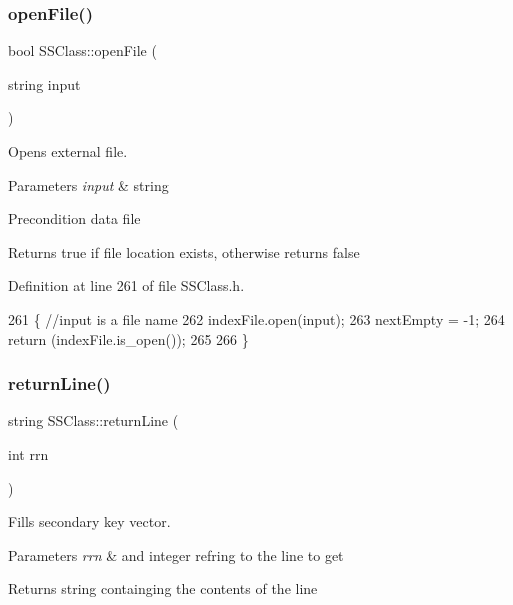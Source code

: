 \subsubsection{\texorpdfstring{open\+File()}{openFile()}}
{\footnotesize\ttfamily bool S\+S\+Class\+::open\+File (\begin{DoxyParamCaption}\item[{string}]{input }\end{DoxyParamCaption})}



Opens external file. 


\begin{DoxyParams}{Parameters}
{\em input} & string \\
\hline
\end{DoxyParams}
\begin{DoxyPrecond}{Precondition}
data file 
\end{DoxyPrecond}
\begin{DoxyReturn}{Returns}
true if file location exists, otherwise returns false 
\end{DoxyReturn}


Definition at line 261 of file S\+S\+Class.\+h.


\begin{DoxyCode}
261                                    \{ \textcolor{comment}{//input is a file name}
262     indexFile.open(input);
263     nextEmpty = -1;
264     \textcolor{keywordflow}{return} (indexFile.is\_open());
265 
266 \}
\end{DoxyCode}
\mbox{\label{classSSClass_ab0a8ea1af895df28359b5733bd920ef3}} 
\subsubsection{\texorpdfstring{return\+Line()}{returnLine()}}
{\footnotesize\ttfamily string S\+S\+Class\+::return\+Line (\begin{DoxyParamCaption}\item[{int}]{rrn }\end{DoxyParamCaption})}



Fills secondary key vector. 


\begin{DoxyParams}{Parameters}
{\em rrn} & and integer refring to the line to get \\
\hline
\end{DoxyParams}
\begin{DoxyReturn}{Returns}
string containging the contents of the line 
\end{DoxyReturn}



